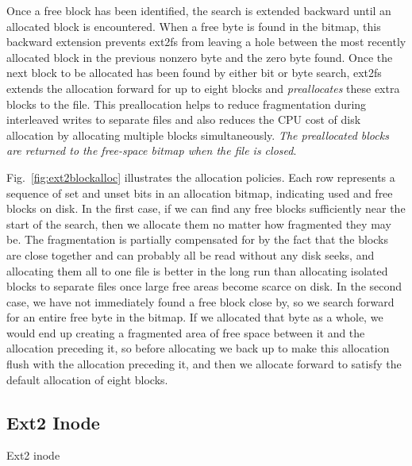 Once a free block has been identified, the search is extended backward until an allocated
block is encountered. When a free byte is found in the bitmap, this backward extension
prevents ext2fs from leaving a hole between the most recently allocated block in the
previous nonzero byte and the zero byte found.  Once the next block to be allocated has
been found by either bit or byte search, ext2fs extends the allocation forward for up to
eight blocks and \emph{preallocates} these extra blocks to the file. This preallocation
helps to reduce fragmentation during interleaved writes to separate files and also reduces
the CPU cost of disk allocation by allocating multiple blocks simultaneously. \emph{The
  preallocated blocks are returned to the free-space bitmap when the file is closed}.

Fig.~\ref{fig:ext2blockalloc} illustrates the allocation policies. Each row represents a
sequence of set and unset bits in an allocation bitmap, indicating used and free blocks on
disk. In the first case, if we can find any free blocks sufficiently near the start of the
search, then we allocate them no matter how fragmented they may be. The fragmentation is
partially compensated for by the fact that the blocks are close together and can probably
all be read without any disk seeks, and allocating them all to one file is better in the
long run than allocating isolated blocks to separate files once large free areas become
scarce on disk. In the second case, we have not immediately found a free block close by,
so we search forward for an entire free byte in the bitmap. If we allocated that byte as a
whole, we would end up creating a fragmented area of free space between it and the
allocation preceding it, so before allocating we back up to make this allocation flush
with the allocation preceding it, and then we allocate forward to satisfy the default
allocation of eight blocks.

\subsection{Ext2 Inode}

\begin{frame}{Ext2 inode}
  \centering
  \mode<beamer>{ \texttt{[image: osc-11-28]} }
\end{frame}

